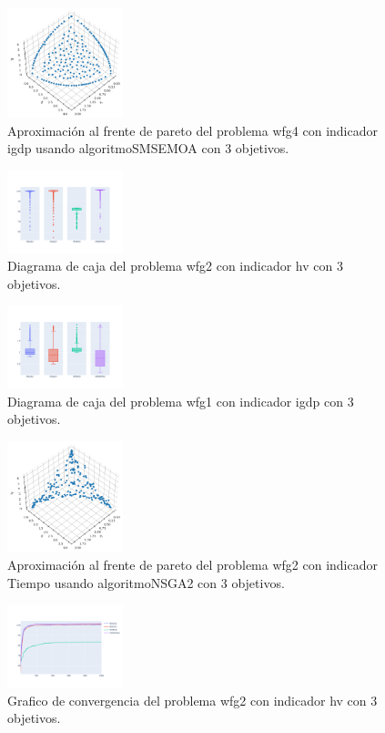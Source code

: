 \documentclass{article}
\begin{document}
\begin{figure}
	\includegraphics[width=0.3\textwidth]{SMSEMOA_wfg4_igdp_3_fp.png}
	\caption{Aproximación al frente de pareto del problema wfg4 con indicador igdp usando algoritmoSMSEMOA con 3 objetivos.}
\end{figure}
\begin{figure}
	\includegraphics[width=0.3\textwidth]{wfg2_hv_3_bp.png}
	\caption{Diagrama de caja del problema wfg2 con indicador hv con 3 objetivos.}
\end{figure}
\clearpage
\begin{figure}
	\includegraphics[width=0.3\textwidth]{wfg1_igdp_3_bp.png}
	\caption{Diagrama de caja del problema wfg1 con indicador igdp con 3 objetivos.}
\end{figure}
\begin{figure}
	\includegraphics[width=0.3\textwidth]{NSGA2_wfg2_Tiempo_3_fp.png}
	\caption{Aproximación al frente de pareto del problema wfg2 con indicador Tiempo usando algoritmoNSGA2 con 3 objetivos.}
\end{figure}
\begin{figure}
	\includegraphics[width=0.3\textwidth]{wfg2_hv_3_gc.png}
	\caption{Grafico de convergencia del problema wfg2 con indicador hv con 3 objetivos.}
\end{figure}
\end{document}
